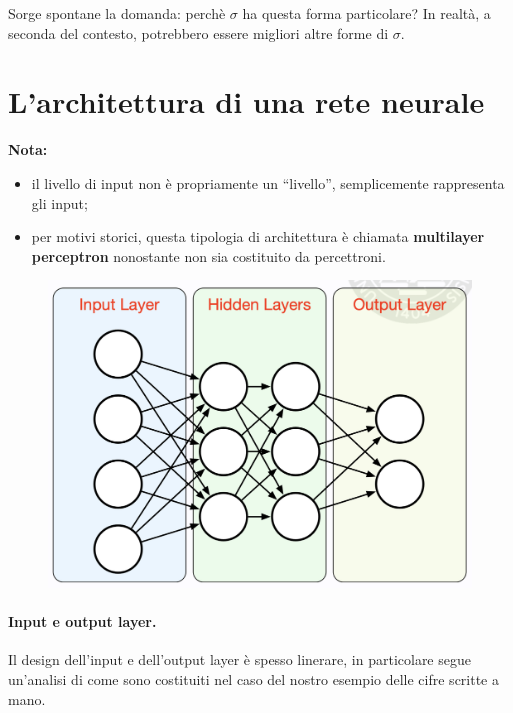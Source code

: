 Sorge spontane la domanda: perchè $\sigma$ ha questa forma particolare? In realtà, a seconda del contesto, potrebbero essere migliori altre forme di $\sigma$.
\newpage
\section{L'architettura di una rete neurale}
\textbf{Nota:}
\begin{itemize}
    \item il livello di input non è propriamente un “livello”, semplicemente rappresenta gli input;
    \item per motivi storici, questa tipologia di architettura è chiamata \textbf{multilayer perceptron} nonostante non sia costituito da percettroni.
\end{itemize}
\begin{figure}[!h]
    \includegraphics[scale=.35]{images/gradient_descent/architecture.png}
    \centering
\end{figure}


\paragraph{Input e output layer.} Il design dell'input e dell'output layer è spesso linerare, in particolare segue un'analisi di come sono costituiti nel caso del nostro esempio delle cifre scritte a mano.
